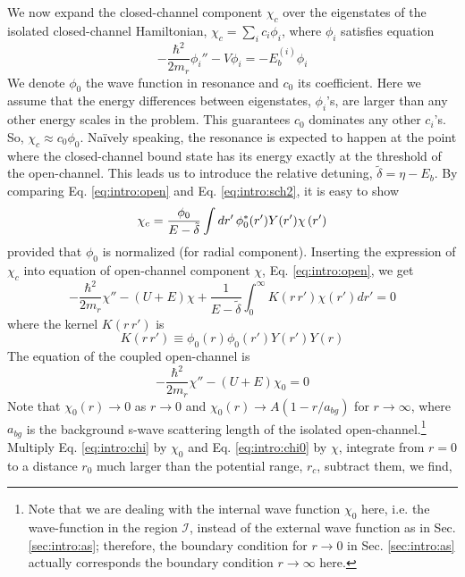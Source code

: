 We now expand the closed-channel component $\chi_{c}$ over the eigenstates of the isolated closed-channel Hamiltonian, $\chi_{c}=\sum_{i}c_{i}\phi_{i}$, where $\phi_{i}$ satisfies \sch equation
\begin{equation}\label{eq:intro:sch2}
-\frac{\hbar^{2}}{2m_{r}}\phi_{i}''-V \phi_{i}=-E_{b}^{(i)}\phi_{i}
\end{equation}
We denote $\phi_{0}$  the wave function  in resonance and $c_{0}$ its coefficient.  Here we assume that the energy differences between eigenstates, $\phi_{i}$'s, are larger than any other energy scales in the problem.  This guarantees $c_{0}$ dominates any other $c_{i}$'s.  So, $\chi_{c}\approx{}c_{0}\phi_{0}$.  Na\"{i}vely speaking, the resonance is expected to happen at the point where the closed-channel bound state has its energy exactly at the threshold of the open-channel.  This leads us to introduce the relative detuning, $\tilde\delta=\eta-E_{b}$. By comparing Eq. \ref{eq:intro:open} and Eq. \ref{eq:intro:sch2}, it is easy to show 
\begin{equation}\label{eq:intro:closeCoeff}
\chi_{c}=\frac{\phi_{0}}{E-\tilde\delta}\int{dr'}\,\phi_{0}^{*}(r')Y(r')\chi\left(r'\right)
\end{equation}
provided that  $\phi_{0}$ is normalized (for radial component).  Inserting the expression of $\chi_{c}$ into \sch equation of open-channel component $\chi$, Eq. \ref{eq:intro:open}, we get 
\begin{equation}\label{eq:intro:chi}
-\frac{\hbar^{2}}{2m_{r}}\chi''-(U+E)\chi+\frac{1}{E-\tilde\delta}\int_{0}^{\infty}K(r\,r')\chi(r')dr'=0
\end{equation}
where the kernel $K(r\,r')$ is
\begin{equation}\label{eq:intro:Krr}
K(r\,r')\equiv\phi_{0}(r)\phi_{0}(r')Y(r')Y(r)
\end{equation}
The  \sch equation of the  coupled open-channel is
\begin{equation}\label{eq:intro:chi0}
-\frac{\hbar^{2}}{2m_{r}}\chi''-(U+E)\chi_{0}=0
\end{equation}
Note that $\chi_{0}(r)\rightarrow0$ as $r\rightarrow0$ and $\chi_{0}(r)\rightarrow{A}(1-r/a_{bg})\label{eq:intro:abg}$ for $r\rightarrow\infty$, where $a_{bg}$ is the background s-wave scattering length of the isolated open-channel.\footnote{Note that we are dealing with the internal wave function $\chi_{0}$ here, i.e. the wave-function in the region $\mathcal{I}$, instead of the external wave function as in Sec. \ref{sec:intro:as}; therefore, the boundary condition for $r\rightarrow0$ in Sec. \ref{sec:intro:as} actually corresponds the boundary condition $r\rightarrow\infty$ here.}  Multiply Eq. \ref{eq:intro:chi} by $\chi_{0}$ and Eq. \ref{eq:intro:chi0} by $\chi$, integrate from $r=0$ to a  distance $r_{0}$ much larger than the potential range, $r_{c}$, subtract them, we find,
